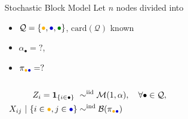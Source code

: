 \documentclass{beamer}\usepackage[]{graphicx}\usepackage[]{color}
\begin{document}
\begin{frame}
\begin{center}
\begin{overlayarea}{\textwidth}{.5\textheight}
\begin{columns}
\begin{column}{.45\paperwidth}
        \end{column}
        \begin{column}{.5\paperwidth}
          \begin{small}
            \begin{block}{Stochastic Block Model}
              Let $n$ nodes divided into
              \begin{itemize}
              \item
                $\mathcal{Q}=\{\textcolor{yellow!40!orange}{\bullet},\textcolor{blue!80!black}{\bullet},\textcolor{green!50!black}{\bullet}\}$,
                $\text{card}(\mathcal{Q})$ known
              \item  $\alpha_\bullet  =  ?$,
              \item      $\pi_{\textcolor{yellow!40!orange}{\bullet}\textcolor{blue!80!black}{\bullet}}     =      ?$
              \end{itemize}
            \end{block}
          \end{small}
        \end{column}
      \end{columns}
    \end{overlayarea}
    \end{center}

  \begin{align*}
    Z_i = \mathbf{1}_{\{i \in \bullet\}}  \ & \sim^{\text{iid}} \mathcal{M}(1,\alpha), \quad \forall\bullet\in\mathcal{Q}, \\
    X_{ij} \ | \ \{i\in\textcolor{yellow!40!orange}{\bullet},j\in\textcolor{blue!80!black}{\bullet}\} & \sim^{\text{ind}} \mathcal{B}(\pi_{\textcolor{yellow!40!orange}{\bullet}\textcolor{blue!80!black}{\bullet}})\\
  \end{align*}

\end{frame}
\end{document}

